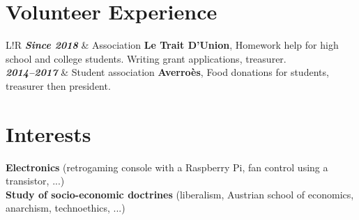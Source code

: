 \documentclass[10pt]{article}
\newcommand\VRule{\color{lightgray}\vrule width 2pt}
\begin{document}
\vspace{1ex}

\section*{Volunteer Experience}

\vspace{2ex}

\begin{tabular}{L!{\VRule}R}
\textbf{\textit{Since 2018}} & Association \textbf{Le Trait D’Union}, Homework help for high school and college students. Writing grant applications, treasurer. \\[0.75cm]

\textbf{\textit{2014--2017}} & Student association \textbf{Averroès}, Food donations for students, treasurer then president. \\
\end{tabular}

\vspace{2ex}

\section*{Interests}

\vspace{2ex}

\hspace*{1ex} \textbf{Electronics} (retrogaming console with a Raspberry Pi, fan control using a transistor, ...) \\
\hspace*{1ex} \textbf{Study of socio-economic doctrines} (liberalism, Austrian school of economics, anarchism, technoethics, ...) \\
\end{document}
